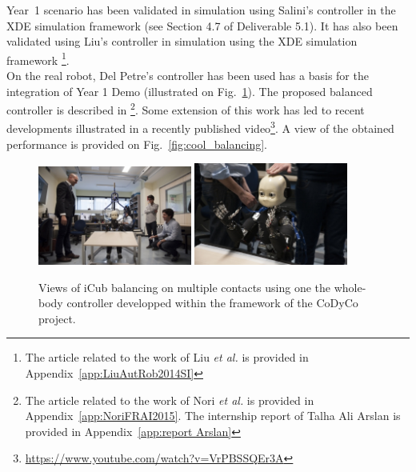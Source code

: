 \documentclass[12pt,a4paper,twoside]{article}
\begin{document}
Year~1 scenario has been validated in simulation using Salini's controller in the XDE simulation framework (see Section 4.7 of Deliverable 5.1). It has also been validated using Liu's controller in simulation using the XDE simulation framework \cite{LiuAutRob2014SI}\footnote{The article related to the work of Liu \textit{et al.}  \cite{LiuAutRob2014SI} is provided in Appendix~\ref{app:LiuAutRob2014SI}}.\\

On the real robot, Del Petre's controller has been used has a basis for the integration of Year 1 Demo (illustrated on Fig.~\ref{fig:year1_demo}). The proposed balanced controller is described in \cite{Nori_FRAI2015,Arslan2014}\footnote{The article related to the work of Nori \textit{et al.} \cite{Nori_FRAI2015} is provided in Appendix~\ref{app:NoriFRAI2015}. The internship report of Talha Ali Arslan \cite{Arslan2014} is provided in Appendix~\ref{app:report Arslan}}. Some extension of this work has led to recent developments illustrated in a recently published video\footnote{\url{https://www.youtube.com/watch?v=VrPBSSQEr3A}}. A view of the obtained performance is provided on Fig.~\ref{fig:cool_balancing}.\\

   \begin{figure}[h!]
      \centering
      \includegraphics[width=0.45\textwidth]{figure/year1_demo}       \includegraphics[width=0.45\textwidth]{figure/year1_demo_2}
      \caption{Views of iCub balancing on multiple contacts using one the whole-body controller developped within the framework of the CoDyCo project.}
      \label{fig:year1_demo}
   \end{figure}
\end{document}
